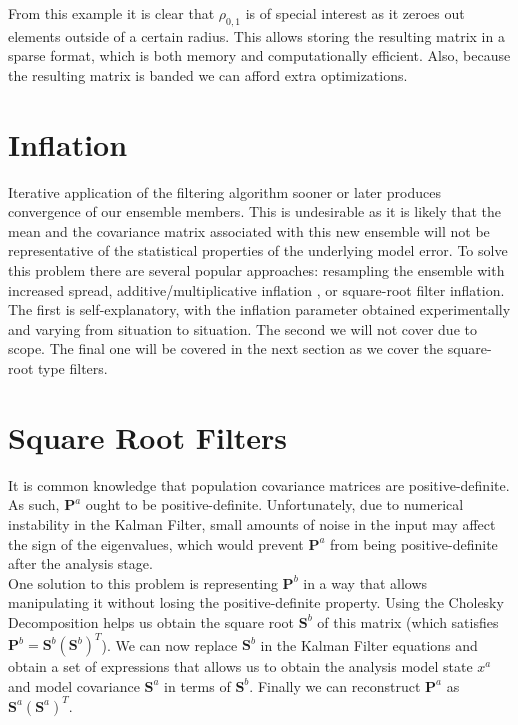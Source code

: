 \documentclass{article}
\begin{document}
From this example it is clear that $\rho_{0,1}$ is of special interest as it zeroes out elements outside of a certain radius. This allows storing the resulting matrix in a sparse format, which is both memory and computationally efficient. Also, because the resulting matrix is banded we can afford extra optimizations. \\

\section{Inflation}

Iterative application of the filtering algorithm sooner or later produces convergence of our ensemble members. This is undesirable as it is likely that the mean and the covariance matrix associated with this new ensemble will not be representative of the statistical properties of the underlying model error. To solve this problem there are several popular approaches: resampling the ensemble with increased spread, additive/multiplicative inflation \cite{Houtekamer2016}, or square-root filter inflation. The first is self-explanatory, with the inflation parameter obtained experimentally and varying from situation to situation. The second we will not cover due to scope. The final one will be covered in the next section as we cover the square-root type filters. \\

\section{Square Root Filters}

It is common knowledge that population covariance matrices are positive-definite. As such, $\mathbf{P}^a$ ought to be positive-definite. Unfortunately, due to numerical instability in the Kalman Filter, small amounts of noise in the input may affect the sign of the eigenvalues, which would prevent $\mathbf{P}^a$ from being positive-definite after the analysis stage. \\

One solution to this problem is representing $\mathbf{P}^b$ in a way that allows manipulating it without losing the positive-definite property. Using the Cholesky Decomposition helps us obtain the square root $\mathbf{S}^b$ \cite{Tippett2003} of this matrix (which satisfies $\mathbf{P}^b = \mathbf{S}^b (\mathbf{S}^b)^T$). We can now replace $\mathbf{S}^b$ in the Kalman Filter equations and obtain a set of expressions that allows us to obtain the analysis model state $x^a$ and model covariance $\mathbf{S}^a$ in terms of $\mathbf{S}^b$. Finally we can reconstruct $\mathbf{P}^a$ as $\mathbf{S}^a (\mathbf{S}^a)^T$. \\
\end{document}
